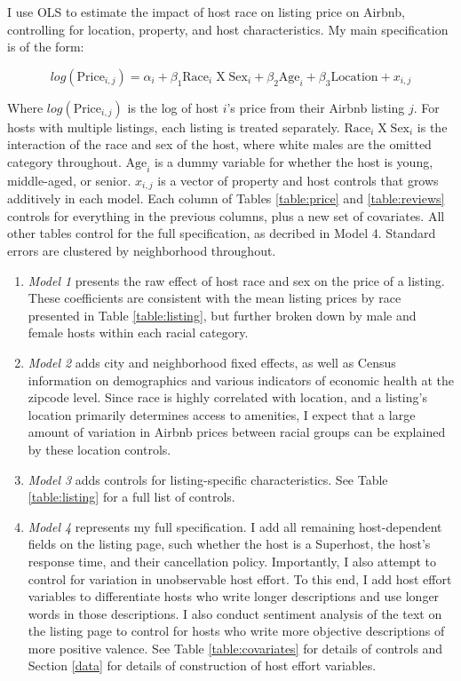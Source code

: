 \label{empirical}

I use OLS to estimate the impact of host race on listing price on Airbnb, controlling for location, property, and host characteristics. My main specification is of the form:

\[ log(\text{Price}_{i,j}) = \alpha_i + \beta_1 \text{Race}_{i} \;  \text{X} \; \text{Sex}_i + \beta_2 \text{Age}_i + \beta_3 \text{Location} +  x_{i,j} \]

Where $log(\text{Price}_{i,j})$ is the log of host $i$'s price from their Airbnb listing $j$. For hosts with multiple listings, each listing is treated separately. $\text{Race}_{i} \;  \text{X} \; \text{Sex}_i$ is the interaction of the race and sex of the host, where white males are the omitted category throughout. $\text{Age}_i$ is a dummy variable for whether the host is young, middle-aged, or senior. $x_{i,j}$ is a vector of property and host controls that grows additively in each model. Each column of Tables \ref{table:price} and \ref{table:reviews} controls for everything in the previous columns, plus a new set of covariates. All other tables control for the full specification, as decribed in Model 4. Standard errors are clustered by neighborhood throughout.

\begin{enumerate}
	\item \textit{Model 1} presents the raw effect of host race and sex on the price of a listing. These coefficients are consistent with the mean listing prices by race presented in Table \ref{table:listing}, but further broken down by male and female hosts within each racial category.
	
	\item \textit{Model 2} adds city and neighborhood fixed effects, as well as Census information on demographics and various indicators of economic health at the zipcode level. Since race is highly correlated with location, and a listing's location primarily determines access to amenities, I expect that a large amount of variation in Airbnb prices between racial groups can be explained by these location controls.
	
	\item \textit{Model 3} adds controls for listing-specific characteristics. See Table \ref{table:listing} for a full list of controls. 
	
	\item \textit{Model 4} represents my full specification. I add all remaining host-dependent fields on the listing page, such whether the host is a Superhost, the host's response time, and their cancellation policy. Importantly, I also attempt to control for variation in unobservable host effort. To this end, I add host effort variables to differentiate hosts who write longer descriptions and use longer words in those descriptions. I also conduct sentiment analysis of the text on the listing page to control for hosts who write more objective descriptions of more positive valence. See Table \ref{table:covariates} for details of controls and Section \ref{data} for details of construction of host effort variables. 
\end{enumerate}





